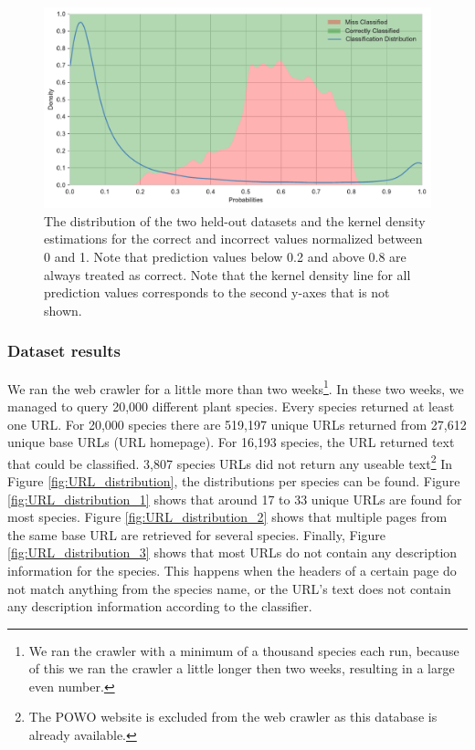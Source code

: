 \documentclass[a4paper, 12pt, oneside]{book} %
\begin{document}
\begin{figure}[htpb]
 \centering
 \includegraphics[width=\textwidth]{figures/predictionvalues_external.pdf}
 \caption[Prediction values of held-out datasets]{The distribution of the two held-out datasets and the kernel density estimations for the correct and incorrect values normalized between 0 and 1. Note that prediction values below 0.2 and above 0.8 are always treated as correct. Note that the kernel density line for all prediction values corresponds to the second y-axes that is not shown.}
 \label{fig:predictionvalues_external}
\end{figure}

\subsubsection{Dataset results}
We ran the web crawler for a little more than two weeks\footnote{We ran the crawler with a minimum of a thousand species each run, because of this we ran the crawler a little longer then two weeks, resulting in a large even number.}.
In these two weeks, we managed to query 20,000 different plant species.
Every species returned at least one URL.
For 20,000 species there are 519,197 unique URLs returned from 27,612 unique base URLs (URL homepage).
For 16,193 species, the URL returned text that could be classified.
3,807 species URLs did not return any useable text\footnote{The POWO website is excluded from the web crawler as this database is already available.}
In Figure \ref{fig:URL_distribution}, the distributions per species can be found.
Figure \ref{fig:URL_distribution_1} shows that around 17 to 33 unique URLs are found for most species.
Figure \ref{fig:URL_distribution_2} shows that multiple pages from the same base URL are retrieved for several species.
Finally, Figure \ref{fig:URL_distribution_3} shows that most URLs do not contain any description information for the species.
This happens when the headers of a certain page do not match anything from the species name, or the URL's text does not contain any description information according to the classifier. 
\end{document}
